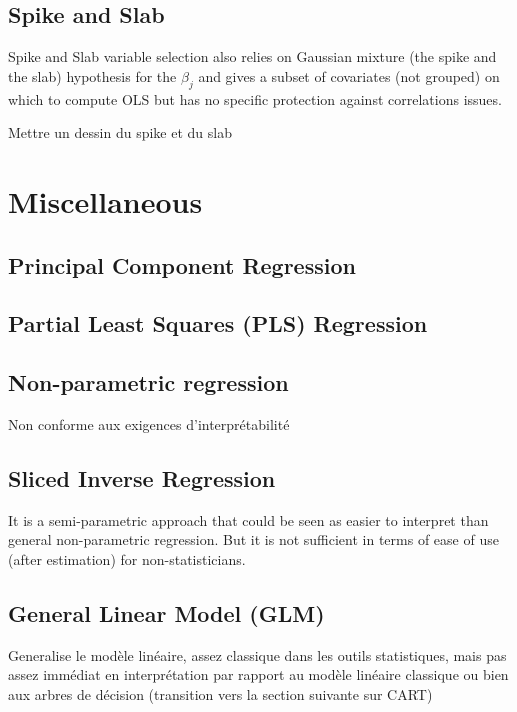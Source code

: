 \documentclass[12pt,a4paper]{report}
\begin{document}
		\subsection{Spike and Slab}			%

			Spike and Slab variable selection \cite{ishwaran2005spike} also relies on Gaussian mixture (the spike and the slab) hypothesis for the $\beta_j$ and gives a subset of covariates (not grouped) on which to compute \textsc{OLS} but has no specific protection against correlations issues.
			
Mettre un dessin du spike et du slab			
			
			
	\section{Miscellaneous}	
	\subsection{Principal Component Regression}
	\cite{jackson2005user}
	\subsection{Partial Least Squares (PLS) Regression}
	\cite{abdi2003partial,geladi1986partial}
	\subsection{Non-parametric regression}
	\cite{eubank1999nonparametric,hardle1990applied}
		Non conforme aux exigences d'interprétabilité
	\subsection{Sliced Inverse Regression}
		It is a semi-parametric approach that could be seen as easier to interpret than general non-parametric regression. But it is not sufficient in terms of ease of use (after estimation) for non-statisticians.
		\cite{li1991sliced,saracco1999regression}
	\subsection{General Linear Model (GLM)}
		\cite{kiebel2003general,wickens2004general,nelder1972generalized,mccullagh1989generalized}
		Generalise le modèle linéaire, assez classique dans les outils statistiques, mais pas assez immédiat en interprétation par rapport au modèle linéaire classique ou bien aux arbres de décision (transition vers la section suivante sur CART)
\end{document}
